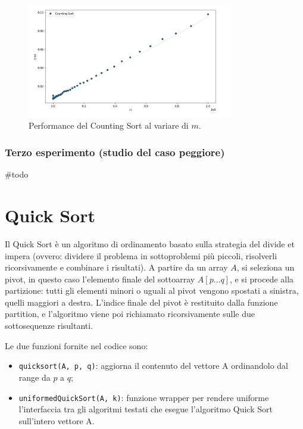 \documentclass[a4paper, 12pt, oneside]{book}
\begin{document}
\begin{figure}[H]
    \centering
    \includegraphics[width=0.8\textwidth]{images/grafico_counting_sort_m.png}
    \caption{Performance del Counting Sort al variare di \(m\).}
    \label{fig:counting_sort_m}
\end{figure}

\subsection{Terzo esperimento (studio del caso peggiore)}
#todo


\chapter{Quick Sort}\label{chap:Quick Sort} %

Il Quick Sort è un algoritmo di ordinamento basato sulla strategia del divide et impera (ovvero: dividere il problema in sottoproblemi più piccoli, risolverli ricorsivamente e combinare i risultati).
A partire da un array \(A\), si seleziona un pivot, in questo caso l'elemento finale del sottoarray \(A[p...q]\), e si procede alla partizione: tutti gli elementi minori o uguali al pivot vengono spostati a sinistra, quelli maggiori a destra. L'indice finale del pivot è restituito dalla funzione partition, e l'algoritmo viene poi richiamato ricorsivamente sulle due sottosequenze risultanti.


\noindent Le due funzioni fornite nel codice sono:

\begin{itemize}
    \item \texttt{quicksort(A, p, q)}: aggiorna il contenuto del vettore A ordinandolo dal range da $p$ a $q$;
    \item \texttt{uniformedQuickSort(A, k)}: funzione wrapper per rendere uniforme l'interfaccia tra gli algoritmi testati che esegue l'algoritmo Quick Sort sull'intero vettore A.
\end{itemize}
\end{document}
